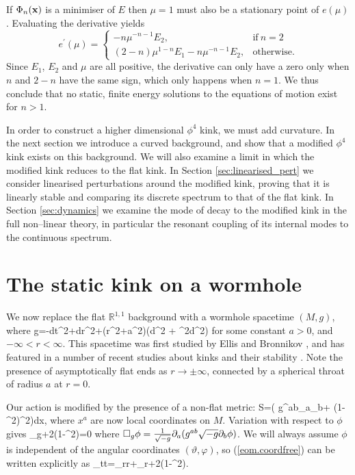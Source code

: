 If $\Phi_n({\bf x})$ is a minimiser of $E$ then $\mu=1$ must also be a stationary point of $e(\mu)$. Evaluating the derivative yields
\[
e^\prime(\mu)= \begin{cases}
      -n\mu^{-n-1}E_2, & \text{if}\ n=2 \\
      (2-n)\mu^{1-n}E_1 -n\mu^{-n-1}E_2, & \text{otherwise}.
    \end{cases}
\]
Since $E_1$, $E_2$ and $\mu$ are all positive, the derivative can only have a zero only when $n$ and $2-n$ have the same sign, which only happens when $n=1$. We thus conclude that no static, finite energy solutions to the equations of motion exist for $n>1$.

In order to construct a higher dimensional $\phi^4$ kink, we must add curvature. In the next section we introduce a curved background, and show that a modified $\phi^4$ kink exists on this background. We will also examine a limit in which the modified kink reduces to the flat kink. In Section \ref{sec:linearised_pert} we consider linearised perturbations around the modified kink, proving that it is linearly stable and comparing its discrete spectrum to that of the flat kink. In Section \ref{sec:dynamics} we examine the mode of decay to the modified kink in the full non--linear theory, in particular the resonant coupling of its internal modes to the continuous spectrum.

\section{The static kink on a wormhole}

We now replace the flat $\mathbb{R}^{1,1}$ background with a wormhole spacetime $(M,g)$, where
\be
\nonumber
g=-dt^2+dr^2+(r^2+a^2)(d\vartheta^2 + \sin^2\vartheta d\varphi^2)
\ee
for some constant $a>0$, and $-\infty<r<\infty$. This spacetime was first studied by Ellis \cite{Ellis} and Bronnikov \cite{Bronnikov}, and has featured in a number of recent studies about kinks and their stability \cite{wavemaps,SG}. Note the presence of asymptotically flat ends as $r\rightarrow\pm\infty$, connected by a spherical throat of radius $a$ at $r=0$.

Our action is modified by the presence of a non-flat metric:
\be
\nonumber
S=\int\bigg( g^{ab}\p_a\phi\p_b\phi + (1-\phi^2)^2\bigg)dx,
\ee
where $x^a$ are now local coordinates on $M$. Variation with respect to $\phi$ gives
\be
\label{eom.coordfree}
\square_g\phi+2\phi(1-\phi^2)=0
\ee
where $\square_g\phi=\frac{1}{\sqrt{-g}}\partial_a(g^{ab}\sqrt{-g}\partial_b\phi)$. We will always assume $\phi$ is independent of the angular coordinates $(\vartheta,\varphi)$, so (\ref{eom.coordfree}) can be written explicitly as
\be
\label{eom.coords}
\phi_{tt}=\phi_{rr}+\phi_r+2\phi(1-\phi^2).
\ee

